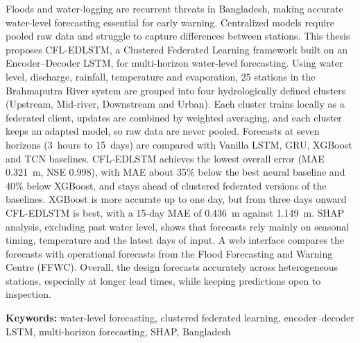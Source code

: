 Floods and water-logging are recurrent threats in Bangladesh, making accurate water-level forecasting essential for early warning. Centralized models require pooled raw data and struggle to capture differences between stations. This thesis proposes CFL-EDLSTM, a Clustered Federated Learning framework built on an Encoder--Decoder LSTM, for multi-horizon water-level forecasting. Using water level, discharge, rainfall, temperature and evaporation, 25 stations in the Brahmaputra River system are grouped into four hydrologically defined clusters (Upstream, Mid-river, Downstream and Urban). Each cluster trains locally as a federated client, updates are combined by weighted averaging, and each cluster keeps an adapted model, so raw data are never pooled. Forecasts at seven horizons (3~hours to 15~days) are compared with Vanilla LSTM, GRU, XGBoost and TCN baselines. CFL-EDLSTM achieves the lowest overall error (MAE 0.321~m, NSE 0.998), with MAE about 35\% below the best neural baseline and 40\% below XGBoost, and stays ahead of clustered federated versions of the baselines. XGBoost is more accurate up to one day, but from three days onward CFL-EDLSTM is best, with a 15-day MAE of 0.436~m against 1.149~m. SHAP analysis, excluding past water level, shows that forecasts rely mainly on seasonal timing, temperature and the latest days of input. A web interface compares the forecasts with operational forecasts from the Flood Forecasting and Warning Centre (FFWC). Overall, the design forecasts accurately across heterogeneous stations, especially at longer lead times, while keeping predictions open to inspection.

\textbf{Keywords:} water-level forecasting, clustered federated learning, encoder--decoder LSTM, multi-horizon forecasting, SHAP, Bangladesh


